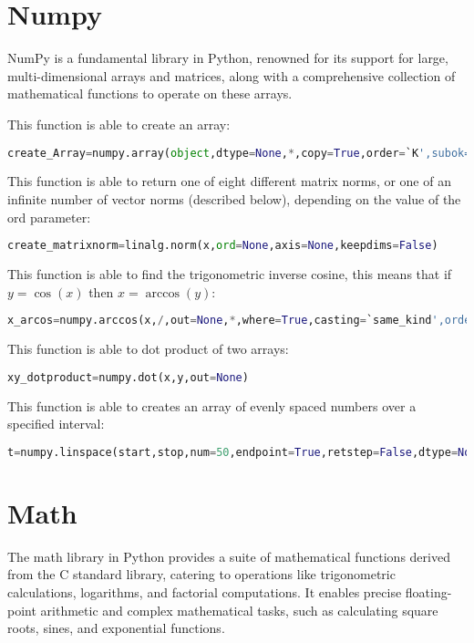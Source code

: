 \section*{Numpy}

NumPy is a fundamental library in Python, renowned for its support for large,
multi-dimensional arrays and matrices,
along with a comprehensive collection of mathematical functions to operate on these arrays.

This function is able to create an array:
\begin{lstlisting}[language=Python]
create_Array=numpy.array(object,dtype=None,*,copy=True,order=`K',subok=False,ndmin=0,like=None)
\end{lstlisting}   

This function is able to return one of eight different matrix norms, or one of an infinite number of vector norms (described below), depending on the value of the ord parameter:
\begin{lstlisting}[language=Python]
create_matrixnorm=linalg.norm(x,ord=None,axis=None,keepdims=False)
\end{lstlisting}

This function is able to find the trigonometric inverse cosine, this means that if $y=\cos(x)$ then $x=\arccos(y)$:
\begin{lstlisting}[language=Python]
x_arcos=numpy.arccos(x,/,out=None,*,where=True,casting=`same_kind',order=`K',dtype=None,subok=True[,signature,extobj])=<ufunc`arccos'>
\end{lstlisting}   

This function is able to dot product of two arrays:
\begin{lstlisting}[language=Python]
xy_dotproduct=numpy.dot(x,y,out=None)
\end{lstlisting}   

This function is able to creates an array of evenly spaced numbers over a specified interval:
\begin{lstlisting}[language=Python]
t=numpy.linspace(start,stop,num=50,endpoint=True,retstep=False,dtype=None,axis=0)
\end{lstlisting}  

\section*{Math}

The math library in Python provides a suite of mathematical functions derived from the C standard library,
catering to operations like trigonometric calculations, logarithms, and factorial computations.
It enables precise floating-point arithmetic
and complex mathematical tasks, such as calculating square roots, sines, and exponential functions.


